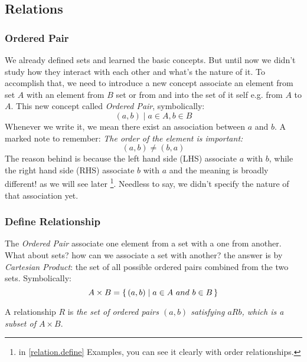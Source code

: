 \subsection{Relations}

\subsubsection{Ordered Pair}
We already defined sets and learned the basic concepts. But until now we didn't study how they interact with each other and what's the nature of it. To accomplish that, we need to introduce a new concept associate an element from set $A$ with an element from $B$ set or from and into the set of it self e.g. from $A$ to $A$.
This new concept called {\it Ordered Pair}, symbolically:
$$
    (a,b) \mid a \in A, b \in B
$$
Whenever we write it, we mean there exist an association between $a$ and $b$. A marked note to remember: {\it The order of the element is important:
$$
    (a,b) \neq (b,a)
$$
} The reason behind is because the left hand side (LHS) associate $a$ with $b$, while the right hand side (RHS) associate $b$ with $a$ and the meaning is broadly different! as we will see later \footnote{in \ref{relation.define} Examples, you can see it clearly with order relationships.}. Needless to say, we didn't specify the nature of that association yet.
\subsubsection{Define Relationship \label{relation.define}}
The {\it Ordered Pair} associate one element from a set with a one from another. What about sets? how can we associate a set with another? the answer is by {\it Cartesian Product}: the set of all possible ordered pairs combined from the two sets. Symbolically:
$$
A \times B = \set{(a,b) \mid a \in A \ and \  b \in B}
$$

A relationship $R$ is {\it the set of ordered pairs $(a,b)$ satisfying $aRb$, which is a subset of $A \times B$}. 
